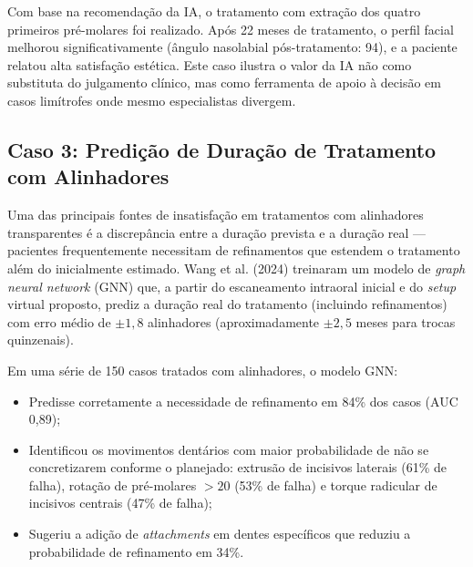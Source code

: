 Com base na recomendação da IA, o tratamento com extração dos quatro primeiros pré-molares foi realizado. Após 22 meses de tratamento, o perfil facial melhorou significativamente (ângulo nasolabial pós-tratamento: 94\textdegree{}), e a paciente relatou alta satisfação estética. Este caso ilustra o valor da IA não como substituta do julgamento clínico, mas como ferramenta de apoio à decisão em casos limítrofes onde mesmo especialistas divergem.

\subsection{Caso 3: Predição de Duração de Tratamento com Alinhadores}

Uma das principais fontes de insatisfação em tratamentos com alinhadores transparentes é a discrepância entre a duração prevista e a duração real --- pacientes frequentemente necessitam de refinamentos que estendem o tratamento além do inicialmente estimado. Wang et al. (2024) treinaram um modelo de \textit{graph neural network} (GNN) que, a partir do escaneamento intraoral inicial e do \textit{setup} virtual proposto, prediz a duração real do tratamento (incluindo refinamentos) com erro médio de $\pm 1,8$ alinhadores (aproximadamente $\pm 2,5$ meses para trocas quinzenais).

Em uma série de 150 casos tratados com alinhadores, o modelo GNN:
\begin{itemize}
    \item Predisse corretamente a necessidade de refinamento em 84\% dos casos (AUC 0,89);
    \item Identificou os movimentos dentários com maior probabilidade de não se concretizarem conforme o planejado: extrusão de incisivos laterais (61\% de falha), rotação de pré-molares $>20$\textdegree{} (53\% de falha) e torque radicular de incisivos centrais (47\% de falha);
    \item Sugeriu a adição de \textit{attachments} em dentes específicos que reduziu a probabilidade de refinamento em 34\%.
\end{itemize}


